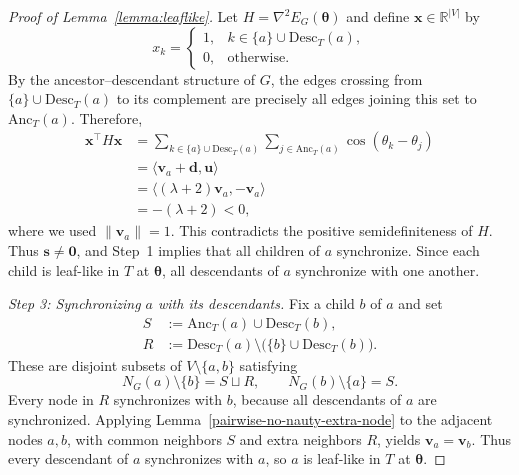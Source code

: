 \documentclass[11pt,reqno]{amsart}
\theoremstyle{definition}
\begin{document}
\begin{proof}[Proof of Lemma~\ref{lemma:leaflike}]
Let $H=\nabla^2 E_G(\boldsymbol{\theta})$ and define
$\boldsymbol{x}\in\mathbb{R}^{|V|}$ by
\[
    x_k=
    \begin{cases}
        1, & k\in\{a\}\cup\mathrm{Desc}_T(a),\\
        0, & \text{otherwise}.
    \end{cases}
\]
By the ancestor--descendant structure of $G$, the edges
crossing from $\{a\}\cup\mathrm{Desc}_T(a)$ to its complement
are precisely all edges joining this set to
$\mathrm{Anc}_T(a)$.
Therefore,
\[
\begin{aligned}
    \boldsymbol{x}^{\top}H\boldsymbol{x}
    &=
    \sum_{k\in\{a\}\cup\mathrm{Desc}_T(a)}
    \sum_{j\in\mathrm{Anc}_T(a)}
    \cos(\theta_k-\theta_j)\\
    &=\langle\mathbf{v}_a+\mathbf{d},\mathbf{u}\rangle\\
    &=\langle(\lambda+2)\mathbf{v}_a,-\mathbf{v}_a\rangle\\
    &=-(\lambda+2)<0,
\end{aligned}
\]
where we used $\|\mathbf{v}_a\|=1$.
This contradicts the positive semidefiniteness of $H$.
Thus $\mathbf{s}\neq\boldsymbol{0}$, and Step~1 implies
that all children of $a$ synchronize.
Since each child is leaf-like in $T$ at
$\boldsymbol{\theta}$, all descendants of $a$ synchronize
with one another.

\medskip
\noindent
\textit{Step 3: Synchronizing $a$ with its descendants.}
Fix a child $b$ of $a$ and set
\[
\begin{aligned}
    S&:=\mathrm{Anc}_T(a)\cup\mathrm{Desc}_T(b),\\
    R&:=\mathrm{Desc}_T(a)\setminus
    \bigl(\{b\}\cup\mathrm{Desc}_T(b)\bigr).
\end{aligned}
\]
These are disjoint subsets of $V\setminus\{a,b\}$ satisfying
\[
    N_G(a)\setminus\{b\}=S\sqcup R,
    \qquad
    N_G(b)\setminus\{a\}=S.
\]
Every node in $R$ synchronizes with $b$, because all
descendants of $a$ are synchronized.
Applying Lemma~\ref{pairwise-no-nauty-extra-node} to the
adjacent nodes $a,b$, with common neighbors $S$ and extra
neighbors $R$, yields $\mathbf{v}_a=\mathbf{v}_b$.
Thus every descendant of $a$ synchronizes with $a$,
so $a$ is leaf-like in $T$ at $\boldsymbol{\theta}$.
\end{proof}
\end{document}
